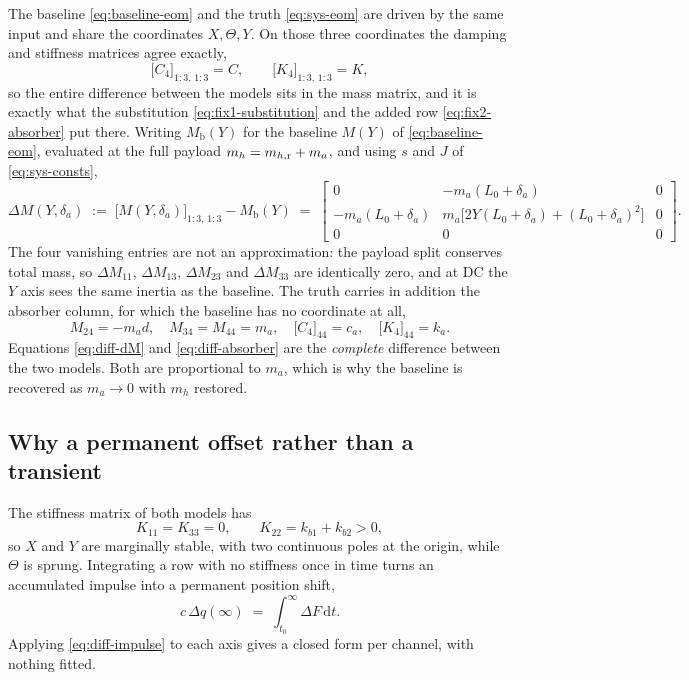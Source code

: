 The baseline \eqref{eq:baseline-eom} and the truth \eqref{eq:sys-eom} are driven by the same
input and share the coordinates $X,\Theta,Y$. On those three coordinates the damping and
stiffness matrices agree exactly,
%
\begin{equation}
  \bigl[C_4\bigr]_{1:3,\,1:3} = C ,
  \qquad
  \bigl[K_4\bigr]_{1:3,\,1:3} = K ,
  \label{eq:diff-CK}
\end{equation}
%
so the entire difference between the models sits in the mass matrix, and it is exactly what the
substitution \eqref{eq:fix1-substitution} and the added row \eqref{eq:fix2-absorber} put there.
Writing $M_{\mathrm b}(Y)$ for the baseline $M(Y)$ of \eqref{eq:baseline-eom}, evaluated at the
full payload $m_h = m_{h,\mathrm{r}} + m_a$, and using $s$ and $J$ of \eqref{eq:sys-consts},
%
\begin{equation}
  \Delta M(Y,\delta_a)
  \;:=\;
  \bigl[M(Y,\delta_a)\bigr]_{1:3,\,1:3} - M_{\mathrm b}(Y)
  \;=\;
  \begin{bmatrix}
    0 & -m_a(L_0{+}\delta_a) & 0 \\[2mm]
    -m_a(L_0{+}\delta_a) & m_a\bigl[2Y(L_0{+}\delta_a) + (L_0{+}\delta_a)^2\bigr] & 0 \\[2mm]
    0 & 0 & 0
  \end{bmatrix} .
  \label{eq:diff-dM}
\end{equation}
%
The four vanishing entries are not an approximation: the payload split conserves total mass, so
$\Delta M_{11}$, $\Delta M_{13}$, $\Delta M_{23}$ and $\Delta M_{33}$ are identically zero, and
at DC the $Y$ axis sees the same inertia as the baseline. The truth carries in addition the
absorber column, for which the baseline has no coordinate at all,
%
\begin{equation}
  M_{24} = -m_a d , \quad M_{34} = M_{44} = m_a , \quad
  \bigl[C_4\bigr]_{44} = c_a , \quad \bigl[K_4\bigr]_{44} = k_a .
  \label{eq:diff-absorber}
\end{equation}
%
Equations \eqref{eq:diff-dM} and \eqref{eq:diff-absorber} are the \emph{complete} difference
between the two models. Both are proportional to $m_a$, which is why the baseline is recovered
as $m_a \to 0$ with $m_h$ restored.

\subsection{Why a permanent offset rather than a transient}
\label{sec:offset-permanent}

The stiffness matrix of both models has
%
\begin{equation}
  K_{11} = K_{33} = 0 , \qquad K_{22} = k_{b1}{+}k_{b2} > 0 ,
  \label{eq:diff-K}
\end{equation}
%
so $X$ and $Y$ are marginally stable, with two continuous poles at the origin, while $\Theta$ is
sprung. Integrating a row with no stiffness once in time turns an accumulated impulse into a
permanent position shift,
%
\begin{equation}
  c \, \Delta q(\infty) \;=\; \int_{t_0}^{\infty}\!\Delta F \, \mathrm{d}t .
  \label{eq:diff-impulse}
\end{equation}
%
Applying \eqref{eq:diff-impulse} to each axis gives a closed form per channel, with nothing
fitted.

